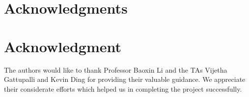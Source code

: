 \documentclass[10pt,journal,compsoc]{IEEEtran}
\begin{document}
  \section*{Acknowledgments}
\else
  \section*{Acknowledgment}
\fi

The authors would like to thank Professor Baoxin Li and the TAs Vijetha Gattupalli and Kevin Ding for providing their valuable guidance. 
We appreciate their considerate efforts which helped us in completing the project successfully.


\ifCLASSOPTIONcaptionsoff
  \newpage
\fi




\end{document}
